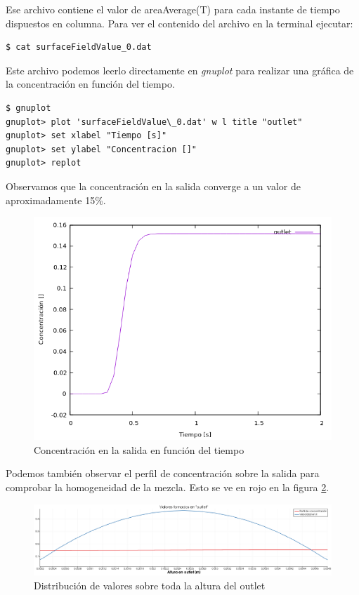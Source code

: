 \documentclass{article}
\begin{document}
Ese archivo contiene el valor de areaAverage(T) para cada instante de tiempo dispuestos en columna. Para ver el contenido del archivo en la terminal ejecutar:
\begin{lstlisting}
$ cat surfaceFieldValue_0.dat
\end{lstlisting}

Este archivo podemos leerlo directamente en \textit{gnuplot} para realizar una gráfica de la concentración en función del tiempo.

\begin{lstlisting}
$ gnuplot
gnuplot> plot 'surfaceFieldValue\_0.dat' w l title "outlet"
gnuplot> set xlabel "Tiempo [s]"
gnuplot> set ylabel "Concentracion []"
gnuplot> replot
\end{lstlisting}

Observamos que la concentración en la salida converge a un valor de aproximadamente 15\%.

\newpage
\begin{figure}[h!]
\centering
\includegraphics[width=1\textwidth]{Figuras/curva_concentracion.png}
\caption{Concentración en la salida en función del tiempo}
\label{fig:curva_conc}
\end{figure}

Podemos también observar el perfil de concentración sobre la salida para comprobar la homogeneidad de la mezcla. Esto se ve en rojo en la figura \ref{fig:curvas_outlet}.

\begin{figure}[h!]
	\centering
	\includegraphics[width=1\textwidth]{Figuras/outlet_graficas.png}
	\caption{Distribución de valores sobre toda la altura del outlet}
	\label{fig:curvas_outlet}
\end{figure}

\end{document}
